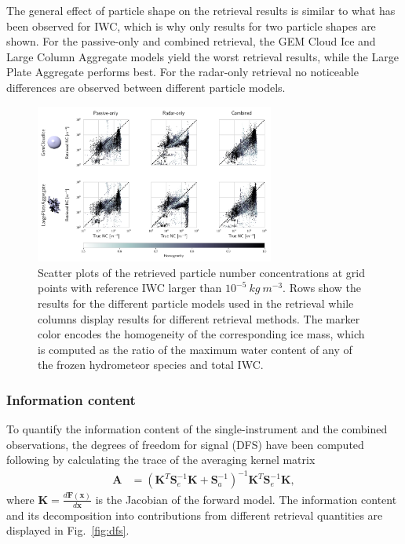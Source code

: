 \documentclass[journal abbreviation, manuscript]{copernicus}
\begin{document}
The general effect of particle shape on the retrieval results is similar to what
has been observed for IWC, which is why only results for two particle shapes are
shown. For the passive-only and combined retrieval, the GEM Cloud Ice and Large
Column Aggregate models yield the worst retrieval results, while the Large Plate
Aggregate performs best. For the radar-only retrieval no noticeable differences
are observed between different particle models.

\begin{figure}
\centering
\includegraphics[width = 0.7\textwidth]{../plots/results_nd_scatter_a}
\caption{Scatter plots of the retrieved particle number concentrations at grid points
  with reference IWC larger than $10^{-5}\ \unit{kg\ m^{-3}}$. Rows show
  the results for the different particle models used in the retrieval while
  columns display  results for  different retrieval methods. The marker
  color encodes the homogeneity of the corresponding ice mass, which is computed
  as the ratio of the maximum water content of any of the frozen hydrometeor
  species and total IWC.}
\label{fig:results_nd_scatter_a}
\end{figure}

\subsubsection{Information content}

To quantify the information content of the single-instrument and the combined
observations, the degrees of freedom for signal (DFS) have been computed
following \cite{rodgers00} by calculating the trace of the averaging kernel
matrix
\begin{align}
  \mathbf{A} &= (\mathbf{K}^T \mathbf{S}_e^{-1} \mathbf{K} +
  \mathbf{S}_a^{-1})^{-1} \mathbf{K}^T \mathbf{S}_e^{-1} \mathbf{K},
\end{align}
where $\mathbf{K} = \frac{d\mathbf{F}(\mathbf{x})}{d\mathbf{x}}$ is the Jacobian
of the forward model. The information content and its decomposition into
contributions from different retrieval quantities are displayed in
Fig.~\ref{fig:dfs}.
\end{document}

